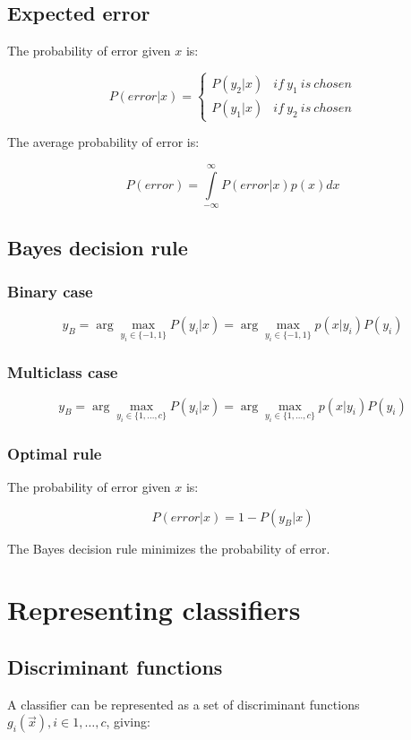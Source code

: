 	\subsection{Expected error}
	The probability of error given $x$ is:

	$$P(error|x) = \begin{cases} P(y_2|x) &if\ y_1\ is\ chosen \\ P(y_1|x) &if\ y_2\ is\ chosen\end{cases}$$

	The average probability of error is:

	$$P(error) = \int\limits_{-\infty}^\infty P(error|x)p(x)dx$$

	\subsection{Bayes decision rule}

		\subsubsection{Binary case}

		$$y_B = \arg\max\limits_{y_i\in\{-1,1\}} P(y_i|x) = \arg\max\limits_{y_i\in\{-1,1\}}p(x|y_i)P(y_i)$$

		\subsubsection{Multiclass case}

		$$y_B = \arg\max\limits_{y_i\in\{1, \dots, c\}} P(y_i|x) = \arg\max\limits_{y_i\in\{1, \dots, c\}}p(x|y_i)P(y_i)$$

		\subsubsection{Optimal rule}
		The probability of error given $x$ is:

		$$P(error|x) = 1 - P(y_B|x)$$

		The Bayes decision rule minimizes the probability of error.

\section{Representing classifiers}

	\subsection{Discriminant functions}
	A classifier can be represented as a set of discriminant functions $g_i(\vec{x}), i\in 1, \dots, c$, giving:

